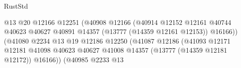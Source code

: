 \begin{lexlean}{RustStd}
\begin{coremodule}
                                                            @13
                                                            @20
                                                            @12166
                                                            @12251
                                                            (@40908
                                                              @12166
                                                              (@40914
                                                                @12152
                                                                @12161
                                                                @40744
                                                                @40623
                                                                @40627
                                                                @40891
                                                                @14357
                                                                (@13777 (@14359 @12161 @12153))
                                                                @16166))
                                                            (@41080
                                                              @2234
                                                              @13
                                                              @19
                                                              @12186
                                                              @12250
                                                              (@41087
                                                                @12186
                                                                (@41093
                                                                  @12171
                                                                  @12181
                                                                  @41098
                                                                  @40623
                                                                  @40627
                                                                  @41008
                                                                  @14357
                                                                  (@13777 (@14359 @12181 @12172))
                                                                  @16166))
                                                              (@40985
                                                                @2233
                                                                @13

\end{coremodule}
\end{lexlean}
